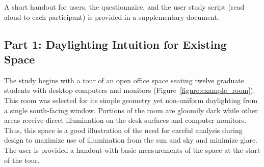\documentclass[preprint]{elsarticle}
\begin{document}
A short handout for users, the questionnaire, and the user study
script (read aloud to each participant) is provided in a supplementary
document.






%






\subsection{Part 1: Daylighting Intuition for Existing Space}




The study begins with a tour of an open office space
seating twelve graduate students with desktop computers and monitors
(Figure~\ref{figure:example_room}).  This room was selected for its
simple geometry yet non-uniform daylighting from a single south-facing
window.  Portions of the room are gloomily dark while other areas
receive direct illumination on the desk surfaces and computer
monitors.  Thus, this space is a good illustration of the need for
careful analysis during design to maximize use of illumination from
the sun and sky and minimize glare.  The user is provided a handout
with basic measurements of the space at the start of the tour.
\end{document}
